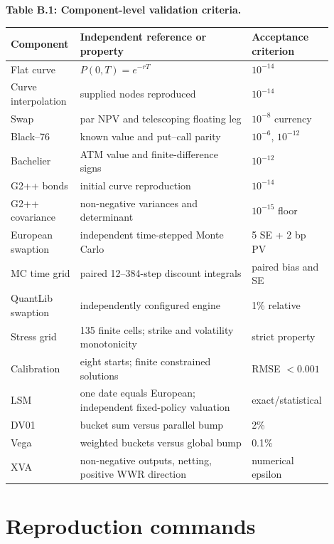 \documentclass[11pt]{article}
\numberwithin{equation}{section}
\theoremstyle{definition}
\theoremstyle{remark}
\begin{document}
\begin{center}
\small\textbf{Table B.1: Component-level validation criteria.}\par\medskip
\scriptsize
\begin{tabular}{p{0.20\linewidth}p{0.52\linewidth}p{0.18\linewidth}}
\toprule
Component & Independent reference or property & Acceptance criterion\\
\midrule
Flat curve & $P(0,T)=e^{-rT}$ & $10^{-14}$\\
Curve interpolation & supplied nodes reproduced & $10^{-14}$\\
Swap & par NPV and telescoping floating leg & $10^{-8}$ currency\\
Black--76 & known value and put--call parity & $10^{-6}$, $10^{-12}$\\
Bachelier & ATM value and finite-difference signs & $10^{-12}$\\
G2++ bonds & initial curve reproduction & $10^{-14}$\\
G2++ covariance & non-negative variances and determinant & $10^{-15}$ floor\\
European swaption & independent time-stepped Monte Carlo & 5 SE + 2 bp PV\\
MC time grid & paired 12--384-step discount integrals & paired bias and SE\\
QuantLib swaption & independently configured engine & 1\% relative\\
Stress grid & 135 finite cells; strike and volatility monotonicity & strict property\\
Calibration & eight starts; finite constrained solutions & RMSE $<0.001$\\
LSM & one date equals European; independent fixed-policy valuation & exact/statistical\\
DV01 & bucket sum versus parallel bump & 2\%\\
Vega & weighted buckets versus global bump & 0.1\%\\
XVA & non-negative outputs, netting, positive WWR direction & numerical epsilon\\
\bottomrule
\end{tabular}
\end{center}

\section{Reproduction commands}
\label{app:commands}
\end{document}
